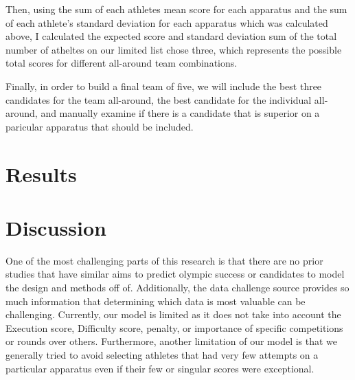 \documentclass[12pt]{article}
\begin{document}
Then, using the sum of each athletes mean score for each apparatus and the sum of each athlete's standard 
deviation for each apparatus which was calculated above, I calculated the expected score and standard deviation sum 
of the total number of atheltes on our limited list chose three, which represents the possible total scores
for different all-around team combinations.

Finally, in order to build a final team of five, we will include the best three candidates for the team 
all-around, the best candidate for the individual all-around, and manually examine if there is a candidate that 
is superior on a paricular apparatus that should be included.


\section{Results}
\label{sec:res}



\section{Discussion}
\label{sec:dis}

One of the most challenging parts of this research is that there are no prior studies that have similar
aims to predict olympic success or candidates to model the design and methods off of. Additionally, 
the data challenge source provides so much information that determining which data is most valuable 
can be challenging. Currently, our model is limited as it does not take into account the 
Execution score, Difficulty score, penalty, or importance of specific competitions or rounds over others. 
Furthermore, another limitation of our model is that we generally tried to avoid selecting athletes that
had very few attempts on a particular apparatus even if their few or singular scores were exceptional.



\end{document}
